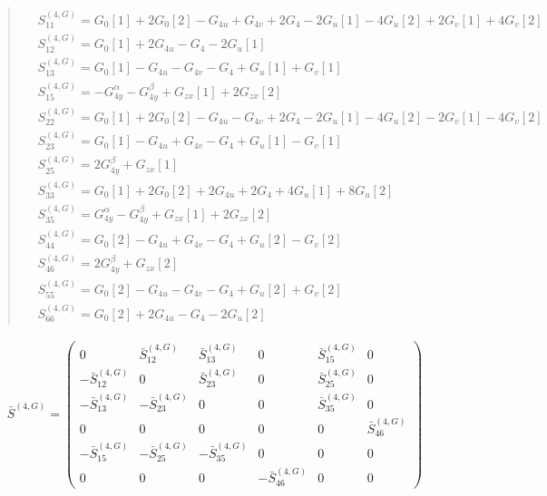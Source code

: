 \documentclass[fleqn,10pt]{jsarticle}
\begin{document}
\begin{quote}
\begin{align*}
& S^{(4,G)}_{11} = G_{0}[1] + 2 G_{0}[2] - G_{4u} + G_{4v} + 2 G_{4} - 2 G_{u}[1] - 4 G_{u}[2] + 2 G_{v}[1] + 4 G_{v}[2] \\
& S^{(4,G)}_{12} = G_{0}[1] + 2 G_{4u} - G_{4} - 2 G_{u}[1] \\
& S^{(4,G)}_{13} = G_{0}[1] - G_{4u} - G_{4v} - G_{4} + G_{u}[1] + G_{v}[1] \\
& S^{(4,G)}_{15} = - G_{4y}^{\alpha} - G_{4y}^{\beta} + G_{zx}[1] + 2 G_{zx}[2] \\
& S^{(4,G)}_{22} = G_{0}[1] + 2 G_{0}[2] - G_{4u} - G_{4v} + 2 G_{4} - 2 G_{u}[1] - 4 G_{u}[2] - 2 G_{v}[1] - 4 G_{v}[2] \\
& S^{(4,G)}_{23} = G_{0}[1] - G_{4u} + G_{4v} - G_{4} + G_{u}[1] - G_{v}[1] \\
& S^{(4,G)}_{25} = 2 G_{4y}^{\beta} + G_{zx}[1] \\
& S^{(4,G)}_{33} = G_{0}[1] + 2 G_{0}[2] + 2 G_{4u} + 2 G_{4} + 4 G_{u}[1] + 8 G_{u}[2] \\
& S^{(4,G)}_{35} = G_{4y}^{\alpha} - G_{4y}^{\beta} + G_{zx}[1] + 2 G_{zx}[2] \\
& S^{(4,G)}_{44} = G_{0}[2] - G_{4u} + G_{4v} - G_{4} + G_{u}[2] - G_{v}[2] \\
& S^{(4,G)}_{46} = 2 G_{4y}^{\beta} + G_{zx}[2] \\
& S^{(4,G)}_{55} = G_{0}[2] - G_{4u} - G_{4v} - G_{4} + G_{u}[2] + G_{v}[2] \\
& S^{(4,G)}_{66} = G_{0}[2] + 2 G_{4u} - G_{4} - 2 G_{u}[2]
\end{align*}
\end{quote}
\begin{align*}
\bar{S}^{(4,G)} = \begin{pmatrix} 0 & \bar{S}^{(4,G)}_{12} & \bar{S}^{(4,G)}_{13} & 0 & \bar{S}^{(4,G)}_{15} & 0 \\ - \bar{S}^{(4,G)}_{12} & 0 & \bar{S}^{(4,G)}_{23} & 0 & \bar{S}^{(4,G)}_{25} & 0 \\ - \bar{S}^{(4,G)}_{13} & - \bar{S}^{(4,G)}_{23} & 0 & 0 & \bar{S}^{(4,G)}_{35} & 0 \\ 0 & 0 & 0 & 0 & 0 & \bar{S}^{(4,G)}_{46} \\ - \bar{S}^{(4,G)}_{15} & - \bar{S}^{(4,G)}_{25} & - \bar{S}^{(4,G)}_{35} & 0 & 0 & 0 \\ 0 & 0 & 0 & - \bar{S}^{(4,G)}_{46} & 0 & 0 \end{pmatrix}
\end{align*}
\end{document}
